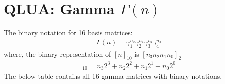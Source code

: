 \section{QLUA: Gamma \texorpdfstring{$\Gamma(n)$}{Gamma(n)}}
\label{app:gamma}
The binary notation for 16 basis matrices:
\begin{align}
    \Gamma(n)=\gamma_{1}^{n_{0}}\gamma_{2}^{n_{1}}\gamma_{3}^{n_{2}}\gamma_{4}^{n_{3}}
\end{align}
where, the binary representation of $[n]_{10}$ is $[n_{3}n_{2}n_{1}n_{0}]_{2}$
\begin{align}
    [n]_{10}=n_{3}2^{3}+n_{2}2^{2}+n_{1}2^{1}+n_{0}2^{0}
\end{align}
The below table contains all 16 gamma matrices with binary notations.
\begin{table}[h!]
\centering
{}
\end{table}